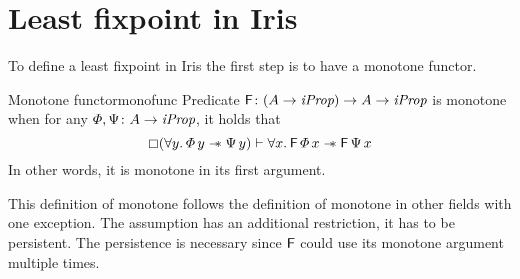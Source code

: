 \documentclass[thesis.tex]{subfiles}
\begin{document}
\section{Least fixpoint in Iris}
\label{sec:fixIris}
To define a least fixpoint in Iris the first step is to have a monotone functor.
\begin{definition}{Monotone functor}{monofunc}
    Predicate $\textsf{\upshape F}\colon (A \to \textit{iProp}) \to  A \to \textit{iProp}$ is monotone when for any $\varPhi, \Psi\colon A \to \textit{iProp}$, it holds that
    \[ \always(\All \varB. \pred\,\varB \wand \predB\,\varB) \proves \All \var. \hopred\,\pred\,\var \wand \hopred\,\predB\,\var\]
    In other words, it is monotone in its first argument.
\end{definition}
This definition of monotone follows the definition of monotone in other fields with one exception. The assumption has an additional restriction, it has to be persistent. The persistence is necessary since $\textsf{\upshape F}$ could use its monotone argument multiple times.
\end{document}
